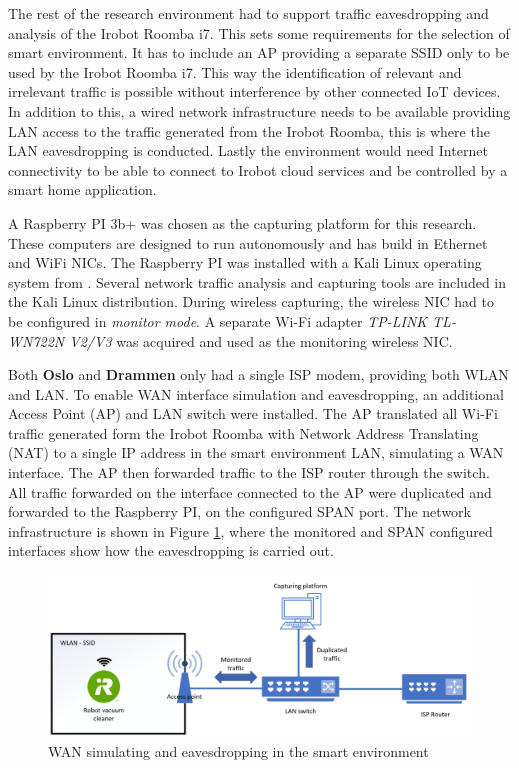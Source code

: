 The rest of the research environment had to support traffic eavesdropping and analysis of the Irobot Roomba i7. This sets some requirements for the selection of smart environment. It has to include an AP providing a separate SSID only to be used by the Irobot Roomba i7. This way the identification of relevant and irrelevant traffic is possible without interference by other connected IoT devices. In addition to this, a wired network infrastructure needs to be available providing LAN access to the traffic generated from the Irobot Roomba, this is where the LAN eavesdropping is conducted. Lastly the environment would need Internet connectivity to be able to connect to Irobot cloud services and be controlled by a smart home application. 

A Raspberry PI 3b+ was chosen as the capturing platform for this research. These computers are designed to run autonomously and has build in Ethernet and WiFi NICs. The Raspberry PI was installed with a Kali Linux operating system from \cite{kalidownload}. Several network traffic analysis and capturing tools are included in the Kali Linux distribution. During wireless capturing, the wireless NIC had to be configured in \textit{monitor mode}. A separate Wi-Fi adapter \textit{TP-LINK TL-WN722N V2/V3} was acquired and used as the monitoring wireless NIC.

Both \textbf{Oslo} and \textbf{Drammen} only had a single ISP modem, providing both WLAN and LAN. To enable WAN interface simulation and eavesdropping, an additional Access Point (AP) and LAN switch were installed. The AP translated all Wi-Fi traffic generated form the Irobot Roomba with Network Address Translating (NAT) to a single IP address in the smart environment LAN, simulating a WAN interface. The AP then forwarded traffic to the ISP router through the switch. All traffic forwarded on the interface connected to the AP were duplicated and forwarded to the Raspberry PI, on the configured SPAN port. The network infrastructure is shown in Figure \ref{fig:WLAN_LAN_setup}, where the monitored and SPAN configured interfaces show how the eavesdropping is carried out. 

\begin{figure}[H]
    \centering
    \includegraphics[width=\textwidth]{figures/WLAN_LAN_setup.png}
    \caption{WAN simulating and eavesdropping in the smart environment}
    \label{fig:WLAN_LAN_setup}
\end{figure}


